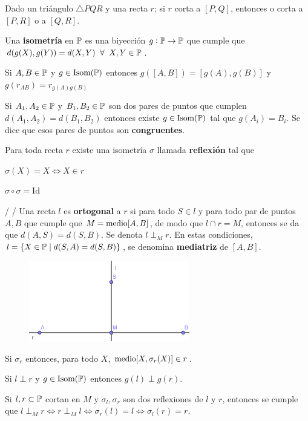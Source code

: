  Dado un triángulo $\triangle PQR$ y una recta $r$; si $r$ corta a $[P,Q]$, entonces o corta a $[P,R]$ o a $[Q, R]$.

 Una \textbf{isometría} en $\P$ es una biyección $g: \P \rightarrow \P$ que cumple que $d(g(X), g(Y)) = d(X,Y) \;\;\forall\;\; X,Y \in \P$.

 Si $A,B \in \P$ y $g \in \iso(\P)$ entonces $g([A,B]) = [g(A), g(B)]$ y $g(r_{AB}) = r_{g(A)g(B)}$ 

 Si $A_1, A_2 \in \P$ y $B_1, B_2 \in \P$ son dos pares de puntos que cumplen $d(A_1,A_2) = d(B_1,B_2)$ entonces existe $g \in \iso(\P)$ tal que $g(A_i) = B_i$. Se dice que esos pares de puntos son \textbf{congruentes}.

 Para toda recta $r$ existe una isometría $\sigma$ llamada \textbf{reflexión} tal que  
\begin{itemizex}
	\item $\sigma(X) = X\iff X \in r$
	\item $\sigma \circ \sigma = \text{Id}$
\end{itemizex}


 /  /  Una recta $l$ es \textbf{ortogonal} a $r$ si para todo $S \in l$ y para todo par de puntos $A, B$ que cumple que $M = \m[A,B]$, de modo que $l \cap r = M$, entonces se da que $d(A,S) = d(S,B)$. Se denota $l \perp_M r$. En estas condiciones, $l = \{X \in \P \; | \; d(S,A) = d(S,B)\}$, se denomina \textbf{mediatriz} de $[A,B]$. 

\begin{figure}[H]
	\centering
	\includegraphics[width=7cm]{figuras/2-23.png}
	\vspace{-1em}
\end{figure}

 Si $\sigma_r$ entonces, para todo $X$, $\m[X, \sigma_r(X)] \in r$.

 Si $l \perp r$ y $g \in \iso(\P)$ entonces $g(l) \perp g(r)$.

 Si $l, r \subset \P$ cortan en $M$ y $\sigma_l, \sigma_r$ son dos reflexiones de $l$ y $r$, entonces se cumple que $l \perp_M r \iff r \perp_M l \iff \sigma_r(l) = l \iff \sigma_l(r) = r$.

